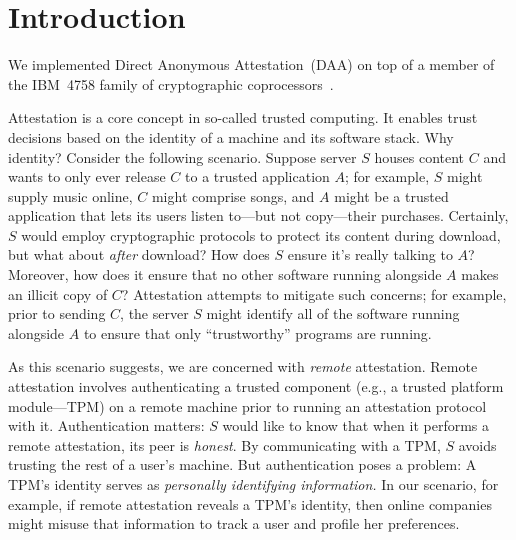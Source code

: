 \section{Introduction}

\begin{comment}
	\emph{PDS:}
	Our goal is to motivate and sketch out our work.
	
	At the moment, I've simply dropped in a copy of our proposal.
	Even if those ideas suffice, we clearly need to adjust the text since
	we're now talking about what we have done rather
	than what we propose to do.
	
	Let's consider improving the ideas.
	
	I want to move away from
	TCG-style attestation to the more general problem of
	\emph{authenticating a remote application}.
	Identifying
	all of the software running on a machine may well uniquely
	identify the machine.
	Authentication without inherently leaking identity enables
	attestation. What other protocols does it enable?
	Voting protocols?
\end{comment}
\fi

We implemented Direct Anonymous Attestation~(DAA) on top of
a member of the IBM~4758 family of
cryptographic coprocessors~\cite{daa,smith:design}.

Attestation is a core concept in so-called trusted computing.
It enables trust decisions based on the identity of a machine
and its software stack.
Why identity?
Consider the following scenario.
Suppose server $S$ houses content $C$ and wants to
only ever release $C$ to a trusted application $A$;
for example, $S$ might supply music online,
$C$ might comprise songs,
and $A$ might be a trusted application that
lets its users listen to---but not copy---their purchases.
Certainly, $S$ would employ cryptographic protocols to protect
its content during download, but what about \emph{after} download?
How does $S$ ensure it's really talking to $A$? Moreover, how does
it ensure that no other software running alongside $A$ makes an illicit
copy of $C$?
Attestation attempts to mitigate such concerns; for example,
prior to sending $C$, the server $S$ might identify all of the
software running alongside $A$ to ensure that only ``trustworthy'' programs
are running.

As this scenario suggests, we are concerned with \emph{remote} attestation.
Remote attestation involves authenticating a trusted component (e.g., a trusted platform module---TPM)
on a remote machine prior to running an attestation protocol
with it.
Authentication matters: $S$ would like to know that when it performs a remote attestation,
its peer is \emph{honest}.
By communicating with a TPM, $S$ avoids trusting
the rest of a user's machine.
But authentication poses a problem: A TPM's identity serves as
\emph{personally identifying information.}
In our scenario, for example, if remote attestation reveals a TPM's identity, then
online companies might misuse that information to track a user and profile
her preferences.

